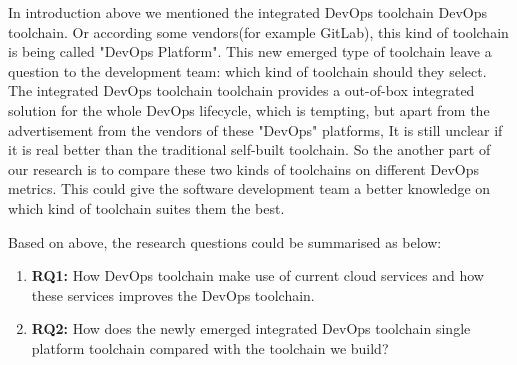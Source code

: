 In introduction above we mentioned the integrated DevOps toolchain DevOps toolchain. Or according some vendors(for example GitLab), this kind of toolchain is being called "DevOps Platform". This new emerged type of toolchain leave a question to the development team: which kind of toolchain should they select. The integrated DevOps toolchain toolchain provides a out-of-box integrated solution for the whole DevOps lifecycle, which is tempting, but apart from the advertisement from the vendors of these "DevOps" platforms, It is still unclear if it is real better than the traditional self-built toolchain. So the another part of our research is to compare these two kinds of toolchains on different DevOps metrics. This could give the software development team a better knowledge on which kind of toolchain suites them the best.
\par
Based on above, the research questions could be summarised as below:
\begin{enumerate}
    \item \textbf{RQ1:} How DevOps toolchain make use of current cloud services and how these services improves the DevOps toolchain.
    \item \textbf{RQ2:} How does the newly emerged integrated DevOps toolchain single platform toolchain compared with the toolchain we build?
\end{enumerate}
